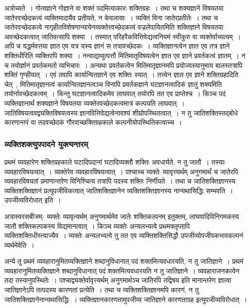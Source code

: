 				\begin{small}
				
					अत्रोच्यते~। गोत्वज्ञाने गोज्ञाने वा शक्तं पदमित्याकारः शक्तिग्रहः~। तथा च शक्यज्ञाने विषयतया जातेरवच्छेदकत्वं व्यक्तिमादायैव प्रतीयते, न केवलायाः~। व्यक्तिं विना जातेरप्रतीतेः~। तथा च जातेरवच्छेदकत्वे नागृहीतविशेषणान्यायेनव्यक्तेरवच्छेदकत्वं वज्रलेपायितमिति शक्तिज्ञाने विषयतया अवच्छेदकत्वात् जातिवत्सापि शक्या~। तस्मात् परिहरैकवित्तिवेद्यत्वनियमं स्वीकुरु वा व्यक्तेर्वाच्यत्वम्~। अपि च यद्धर्मवत्तया ज्ञात एव यत्र यस्य ज्ञानं स तत्रावच्छेदकः~। व्यक्तिज्ञानत्वेन ज्ञात एव तत्र ज्ञाने शक्तिधीरिति व्यक्तिरपि शक्या~। नन्वाद्यव्युत्पत्तौ मितिमातृविषयत्वेन ज्ञात एव ज्ञाने प्रवर्तकत्वं ज्ञातम्~। न च तयोर्ज्ञानं प्रवर्तकमतो व्यभिचारः~। अन्यथा प्रवर्तकत्वेन मितिमातृज्ञानमपि प्रयोज्यस्यानुमाय बालस्तत्रापि शक्तिं गृण्हीयात्~। एवं तवापि कार्यान्वितज्ञाने एव शक्तिः स्यात्~। तत्त्वेन ज्ञात एव ज्ञाने शक्तिग्रहादिति चेत्~, मितिमातृज्ञानत्वं कार्यान्वितज्ञानत्वञ्च विनापि प्रवर्तकज्ञाने घटज्ञानत्वादिकं ज्ञातुं शक्यमिति तयोर्नावच्छेदकत्वम्~। किन्तु घटज्ञानत्वादिकमेव लाघवात् तयोरपि तत एव प्राप्तेश्च~। किञ्च पदं व्यक्तिज्ञानार्थं शक्यज्ञाने विषयतया व्यक्तेरवच्छेदकत्वमात्रं कल्पयति लाघवात्~। जातिविषयत्ववद्व्यक्तिविषयत्वस्य ज्ञानवित्तिवेद्यत्वेनावश्यं शीघ्रोपस्थितत्वात्~। न तु जातिशक्तिस्तद्बोधे कारणान्तरं वा तदवच्छेदकं गौरवाच्छक्तिग्रहकाले कल्पनीयोपस्थितिकत्वाच्च~।  
				\end{small}

			\subsubsection{व्यक्तिशक्त्युपपादने युक्त्यन्तरम्}

				प्रथमं व्यवहारेण शक्तिग्रहकाले घटादिपदानां घटादिव्यक्तौ शक्तिः अवधार्यते, न तु जातौ~। तस्याः व्यवहारविषयत्वात्~। व्यक्तेरेव व्यवहारविषयत्वात्~। पश्चाच्च व्यक्तेः व्यावृत्त्यर्थम् अनुगमार्थं च जातेरपि व्यवहारविषयतां प्रमाणान्तरेण विनिश्चित्य तत्रापि पदस्य शक्तिः निर्णीयते~। तथा च जातिशक्तिज्ञानस्य व्यक्तिशक्तिज्ञानं प्रत्युपजीविकत्वात् जातिशक्तिज्ञानेन व्यक्तिशक्तिज्ञानस्य नान्यथासिद्धिः सम्भवति~। उपजीव्यविरोधात् इति~। 

				अत्रास्वरसबीजम्- व्यक्तेः व्यावृत्यर्थम् अनुगमार्थमेव जातेः शक्तिकल्पनम् इतुक्तम्, लाघवादिविनिगमकस्य जातौ शक्तिकल्पकस्य विद्यमानत्वात्~। किञ्च व्यक्तेः अन्यलभ्यत्वे प्रथमक्लृप्तापि व्यक्तिशक्तिधीस्त्याज्यैव~। व्यक्तेः अन्यलभ्यत्वे तु तत एव व्यक्तिशक्तिसिद्धौ उपजीव्योपजीवकभावकल्पनं व्यर्थमेवेति~। 

				\begin{small}

					अन्ये तु प्रथमं व्यवहारानुमितव्यक्तिज्ञाने शब्दानुविधानात् पदं शक्तमित्यवधारयति, न तु जातिज्ञाने~। प्रथमं व्यवहारानुमितव्यक्तिज्ञाने शब्दानुविधानात् पदं शक्तमित्यवधारयति न तु जातिज्ञाने~। व्यवहाराजनकत्वेन तदा तस्यानुपस्थितेः~। पश्चाद्व्यक्तेर्वावृत्त्यर्थम् अनुगमार्थञ्च जातिरपि तद्विषय इति मानान्तरेण ज्ञात्वा जातिज्ञानेऽपि तत्पदस्य कारणतां प्रत्येति~। तथा च व्यक्तिशक्तिज्ञानमपि कारणं, न तु जातिशक्तिज्ञानेनान्यथासिद्धिः~। व्यक्तिज्ञानकारणतामुपजीव्य जातिज्ञाने कारणताग्रह इत्युपजीव्यविरोधात्~। 
				\end{small}

